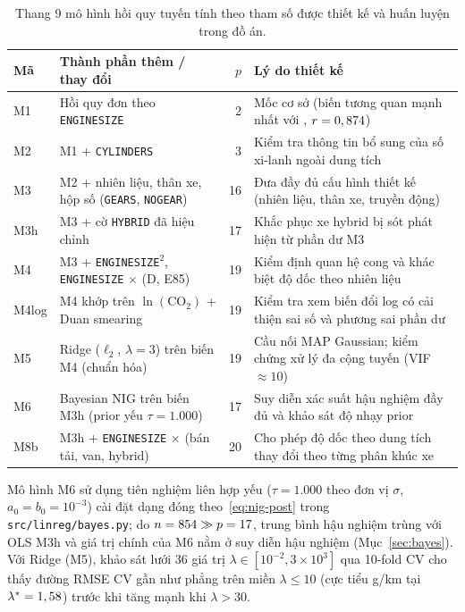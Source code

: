 \begin{table}[htbp]
  \centering
  \caption{Thang 9 mô hình hồi quy tuyến tính theo tham số được thiết kế và huấn luyện trong đồ án.}
  \label{tab:ladder}
  \small
  \begin{tabular}{@{}l >{\raggedright\arraybackslash}p{5.3cm} r >{\raggedright\arraybackslash}p{6.4cm}@{}}
    \toprule
    Mã & Thành phần thêm / thay đổi & $p$ & Lý do thiết kế \\
    \midrule
    M1 & Hồi quy đơn theo \texttt{ENGINESIZE} & 2 & Mốc cơ sở (biến tương quan mạnh nhất với \COtwo{}, $r = 0,874$) \\
    M2 & M1 + \texttt{CYLINDERS} & 3 & Kiểm tra thông tin bổ sung của số xi-lanh ngoài dung tích \\
    M3 & M2 + nhiên liệu, thân xe, hộp số (\texttt{GEARS}, \texttt{NOGEAR}) & 16 & Đưa đầy đủ cấu hình thiết kế (nhiên liệu, thân xe, truyền động) \\
    M3h & M3 + cờ \texttt{HYBRID} đã hiệu chỉnh & 17 & Khắc phục \nHybridMissed{} xe hybrid bị sót phát hiện từ phần dư M3 \\
    M4 & M3 + \texttt{ENGINESIZE}$^2$, \texttt{ENGINESIZE} $\times$ (D, E85) & 19 & Kiểm định quan hệ cong và khác biệt độ dốc theo nhiên liệu \\
    M4log & M4 khớp trên $\ln(\text{CO}_2)$ + Duan smearing & 19 & Kiểm tra xem biến đổi log có cải thiện sai số và phương sai phần dư \\
    M5 & Ridge ($\ell_2$, $\lambda = 3$) trên biến M4 (chuẩn hóa) & 19 & Cầu nối MAP Gaussian; kiểm chứng xử lý đa cộng tuyến (VIF $\approx 10$) \\
    M6 & Bayesian NIG trên biến M3h (prior yếu $\tau = 1.000$) & 17 & Suy diễn xác suất hậu nghiệm đầy đủ và khảo sát độ nhạy prior \\
    M8b & M3h + \texttt{ENGINESIZE} $\times$ (bán tải, van, hybrid) & 20 & Cho phép độ dốc theo dung tích thay đổi theo từng phân khúc xe \\
    \bottomrule
  \end{tabular}
\end{table}

Mô hình M6 sử dụng tiên nghiệm liên hợp yếu ($\tau = 1.000$ theo đơn vị $\sigma$, $a_0 = b_0 = 10^{-3}$) cài đặt dạng đóng theo~\eqref{eq:nig-post} trong \texttt{src/linreg/bayes.py}; do $n = 854{} \gg p = 17$, trung bình hậu nghiệm trùng với OLS M3h và giá trị chính của M6 nằm ở suy diễn hậu nghiệm (Mục~\ref{sec:bayes}). Với Ridge (M5), khảo sát lưới 36 giá trị $\lambda \in [10^{-2}, 3\times 10^3]$ qua 10-fold CV cho thấy đường RMSE CV gần như phẳng trên miền $\lambda \le 10$ (cực tiểu \ridgeBestCv{} g/km tại $\lambda^* = 1,58$) trước khi tăng mạnh khi $\lambda > 30$.

